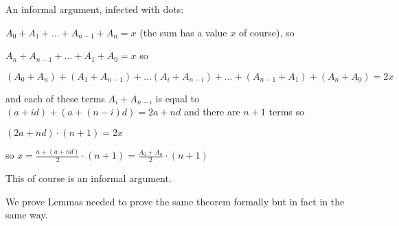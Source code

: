 \documentclass[12pt]{article}
\begin{document}
\begin{description}
An informal argument, infected with dots:

$A_0 + A_1 + \ldots +A_{n-1} + A_n = x$  (the sum has a value $x$ of course), so

$A_n + A_{n-1} + \ldots +A_1 + A_0 = x$  so

$(A_0 + A_n) + (A_1 + A_{n-1}) + \ldots (A_i + A_{n-i})+ \ldots + (A_{n-1} + A_1) + (A_n + A_0) = 2x$

and each of these terms $A_i + A_{n-i}$ is equal to $(a+id)+(a+(n-i)d) = 2a+nd$ and there are $n+1$ terms so

$(2a+nd)\cdot (n+1) = 2x$

so $x = \frac{a+(a+nd)}2 \cdot (n+1) = \frac{A_0 + A_n}2 \cdot (n+1)$

\end{description}

This of course is an informal argument.

We prove Lemmas needed to prove the same theorem formally but in fact in the same way.
\end{document}
